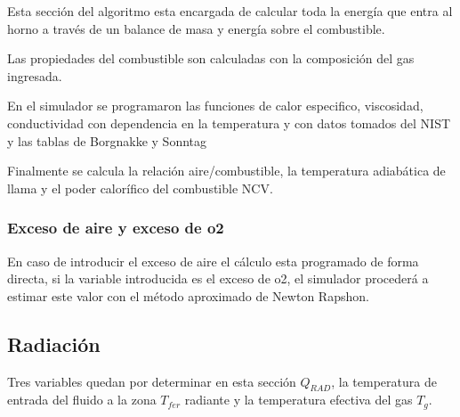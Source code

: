 \par Esta sección del algoritmo esta encargada de calcular toda la energía que entra al horno a través de un balance de masa y energía sobre el combustible.
\par Las propiedades del combustible son calculadas con la composición del gas ingresada.
\par En el simulador se programaron las funciones de calor especifico, viscosidad, conductividad con dependencia en la temperatura y con datos tomados del NIST\cite{nist} y las tablas de Borgnakke y Sonntag\cite{bib:vanwylen}
\par Finalmente se calcula la relación aire/combustible, la temperatura adiabática de llama y el poder calorífico del combustible NCV.

\subsubsection{Exceso de aire y exceso de \ac{o2}}
\par En caso de introducir el exceso de aire el cálculo esta programado de forma directa, si la variable introducida es el exceso de \ac{o2}, el simulador procederá a estimar este valor con el método aproximado de Newton Rapshon.

\subsection{Radiación}
\par Tres variables quedan por determinar en esta sección $Q_{RAD}$, la temperatura de entrada del fluido a la zona $T_{fer}$ radiante y la temperatura efectiva del gas $T_g$.

